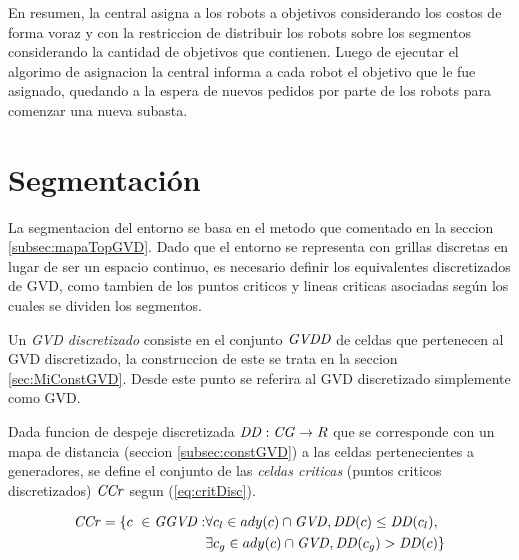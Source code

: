 
En resumen, la central asigna a los robots a objetivos considerando los costos
de forma voraz y con la restriccion de distribuir los robots sobre los
segmentos considerando la cantidad de objetivos que contienen. Luego de
ejecutar el algorimo de asignacion la central informa a cada robot el objetivo
que le fue asignado, quedando a la espera de nuevos pedidos por parte de los
robots para comenzar una nueva subasta. 

\section{Segmentación}\label{subsec:mapaTopGVDGrid}

La segmentacion del entorno se basa en el metodo que comentado en la seccion
\ref{subsec:mapaTopGVD}. Dado que el entorno se representa con grillas
discretas en lugar de ser un espacio continuo, es necesario definir los
equivalentes discretizados de GVD, como tambien de los puntos criticos y lineas
criticas asociadas según los cuales se dividen los segmentos.

Un \emph{GVD discretizado} consiste en el conjunto $\mathit{GVDD}$ de celdas que
pertenecen al GVD discretizado, la construccion de este se trata en la seccion
\ref{sec:MiConstGVD}. Desde este punto se referira al GVD discretizado
simplemente como GVD.

Dada funcion de despeje discretizada $\mathit{DD} : \mathit{CG} \rightarrow R$ que se
corresponde con un mapa de distancia (seccion \ref{subsec:constGVD}) a las
celdas pertenecientes a generadores, se define el conjunto de las \emph{celdas
criticas} (puntos criticos discretizados) $\mathit{CCr}$ segun
(\ref{eq:critDisc}). 

\begin{equation}
\begin{split}
  \mli{CCr} = \{c\ \in \mli{GGVD} : & \forall c_l \in ady(c) \cap \mli{GVD}, \mli{DD}(c) \leq \mli{DD}(c_l),\\
                                    & \exists c_g \in ady(c) \cap \mli{GVD}, \mli{DD}(c_g) > \mli{DD}(c) \} %
\end{split}
\label{eq:critDisc}
\end{equation}

